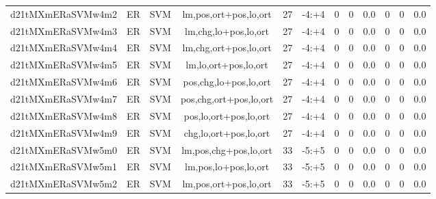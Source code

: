 \documentclass[a4paper]{article}
\begin{document}
\begin{landscape}
\begin{center}
\begin{tabular}{ |c|c|c|c|c|c|c|c|c|c|c|c|}
 
 	
 	\small{ d21tMXmERaSVMw4m2 } & ER & SVM & lm,pos,ort+pos,lo,ort  &  27 &  -4:+4  &  0 & 0 & 0.0  &  0 & 0 & 0.0 \\
 	

 
 	
 	\small{ d21tMXmERaSVMw4m3 } & ER & SVM & lm,chg,lo+pos,lo,ort  &  27 &  -4:+4  &  0 & 0 & 0.0  &  0 & 0 & 0.0 \\
 	

 
 	
 	\small{ d21tMXmERaSVMw4m4 } & ER & SVM & lm,chg,ort+pos,lo,ort  &  27 &  -4:+4  &  0 & 0 & 0.0  &  0 & 0 & 0.0 \\
 	

 
 	
 	\small{ d21tMXmERaSVMw4m5 } & ER & SVM & lm,lo,ort+pos,lo,ort  &  27 &  -4:+4  &  0 & 0 & 0.0  &  0 & 0 & 0.0 \\
 	

 
 	
 	\small{ d21tMXmERaSVMw4m6 } & ER & SVM & pos,chg,lo+pos,lo,ort  &  27 &  -4:+4  &  0 & 0 & 0.0  &  0 & 0 & 0.0 \\
 	

 
 	
 	\small{ d21tMXmERaSVMw4m7 } & ER & SVM & pos,chg,ort+pos,lo,ort  &  27 &  -4:+4  &  0 & 0 & 0.0  &  0 & 0 & 0.0 \\
 	

 
 	
 	\small{ d21tMXmERaSVMw4m8 } & ER & SVM & pos,lo,ort+pos,lo,ort  &  27 &  -4:+4  &  0 & 0 & 0.0  &  0 & 0 & 0.0 \\
 	

 
 	
 	\small{ d21tMXmERaSVMw4m9 } & ER & SVM & chg,lo,ort+pos,lo,ort  &  27 &  -4:+4  &  0 & 0 & 0.0  &  0 & 0 & 0.0 \\
 	

 
 	
 	\small{ d21tMXmERaSVMw5m0 } & ER & SVM & lm,pos,chg+pos,lo,ort  &  33 &  -5:+5  &  0 & 0 & 0.0  &  0 & 0 & 0.0 \\
 	

 
 	
 	\small{ d21tMXmERaSVMw5m1 } & ER & SVM & lm,pos,lo+pos,lo,ort  &  33 &  -5:+5  &  0 & 0 & 0.0  &  0 & 0 & 0.0 \\
 	

 
 	
 	\small{ d21tMXmERaSVMw5m2 } & ER & SVM & lm,pos,ort+pos,lo,ort  &  33 &  -5:+5  &  0 & 0 & 0.0  &  0 & 0 & 0.0 \\
 	


\end{tabular}
\end{center}
\end{landscape}
\end{document}
